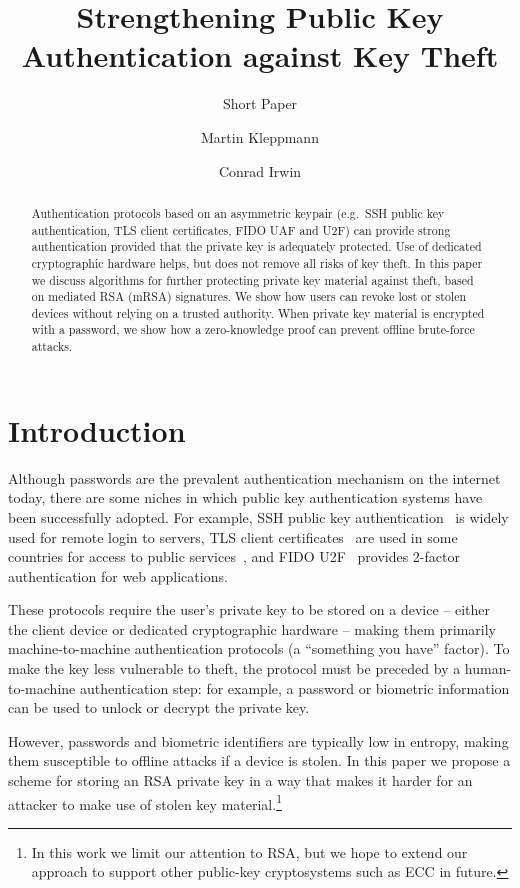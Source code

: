 \documentclass{llncs}
\begin{document}
\title{Strengthening Public Key Authentication against Key Theft}
\subtitle{Short Paper}
\author{Martin Kleppmann \and Conrad Irwin}
\maketitle

\begin{abstract}
Authentication protocols based on an asymmetric keypair (e.g.\ SSH public key authentication, TLS
client certificates, FIDO UAF and U2F) can provide strong authentication provided that the private
key is adequately protected. Use of dedicated cryptographic hardware helps, but does not remove all
risks of key theft. In this paper we discuss algorithms for further protecting private key material
against theft, based on mediated RSA (mRSA) signatures. We show how users can revoke lost or stolen
devices without relying on a trusted authority. When private key material is encrypted with a
password, we show how a zero-knowledge proof can prevent offline brute-force attacks.
\end{abstract}

\section{Introduction}\label{sec:intro}

Although passwords are the prevalent authentication mechanism on the internet today, there are some
niches in which public key authentication systems have been successfully adopted. For example, SSH
public key authentication~\cite{SSH} is widely used for remote login to servers, TLS client
certificates~\cite{TLS} are used in some countries for access to public services~\cite{Parsovs14},
and FIDO U2F~\cite{FIDOOverview} provides 2-factor authentication for web applications.

These protocols require the user's private key to be stored on a device -- either the client device
or dedicated cryptographic hardware -- making them primarily machine-to-machine authentication
protocols (a ``something you have'' factor). To make the key less vulnerable to theft, the protocol
must be preceded by a human-to-machine authentication step: for example, a password or biometric
information can be used to unlock or decrypt the private key.

However, passwords and biometric identifiers are typically low in entropy, making them susceptible
to offline attacks if a device is stolen. In this paper we propose a scheme for storing an RSA
private key in a way that makes it harder for an attacker to make use of stolen key
material.\footnote{In this work we limit our attention to RSA, but we hope to extend our approach to
support other public-key cryptosystems such as ECC in future.}
\end{document}
